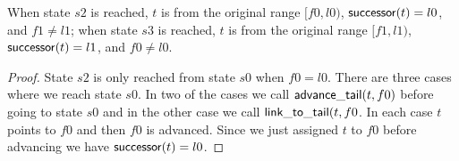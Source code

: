 \begin{lemma}
	When state $s2$ is reached, $t$ is from the original range $[f0, l0)$, $\mathsf{successor}(t) = l0$, and
	$f1 \neq l1$; when state $s3$ is reached, $t$ is from the original range $[f1, l1)$,
	$\mathsf{successor}(t) = l1$, and $f0 \neq l0$.
\end{lemma}

\begin{proof}
	State $s2$ is only reached from state $s0$ when $f0 = l0$. There are three cases where we reach state
	$s0$. In two of the cases we call $\mathsf{advance\_tail}(t, f0)$ before going to state $s0$ and in the other
	case we call $\mathsf{link\_to\_tail}(t, f0$. In each case $t$ points to $f0$ and then $f0$ is advanced. Since
	we just assigned $t$ to $f0$ before advancing we have $\mathsf{successor}(t) = l0$.
\end{proof}
